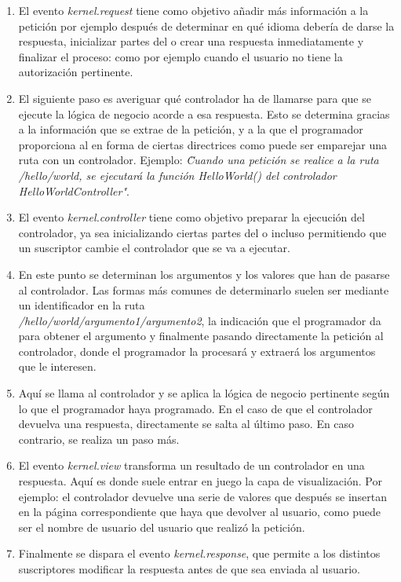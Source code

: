 \begin{enumerate}
    \item El evento \textit{kernel.request} tiene como objetivo añadir más
        información a la petición \textemdash por ejemplo después de determinar
        en qué idioma debería de darse la respuesta\textemdash, inicializar
        partes del  o crear una respuesta
        inmediatamente y finalizar el proceso: como por ejemplo cuando el
        usuario no tiene la autorización pertinente.
    \item El siguiente paso es averiguar qué controlador ha de llamarse para
        que se ejecute la lógica de negocio acorde a esa respuesta. Esto se
        determina gracias a la información que se extrae de la petición, y a la
        que el programador proporciona al  en
        forma de ciertas directrices como puede ser emparejar una ruta con
        un controlador. Ejemplo: \textit{\"Cuando una petición se realice a la
        ruta /hello/world, se ejecutará la función HelloWorld() del controlador
        HelloWorldController"}.
    \item El evento \textit{kernel.controller} tiene como objetivo preparar la
        ejecución del controlador, ya sea inicializando ciertas partes del
         o incluso permitiendo que un
        suscriptor cambie el controlador que se va a ejecutar.
    \item En este punto se determinan los argumentos y los valores que han de
        pasarse al controlador. Las formas más comunes de determinarlo suelen
        ser mediante un identificador en la ruta\\ \textemdash
        \textit{/hello/world/argumento1/argumento2}\textemdash, la indicación
        que el programador da para obtener el argumento y finalmente pasando
        directamente la petición al controlador, donde el programador la
        procesará y extraerá los argumentos que le interesen.
    \item Aquí se llama al controlador y se aplica la lógica de negocio
        pertinente según lo que el programador haya programado. En el caso de
        que el controlador devuelva una respuesta, directamente se salta al
        último paso. En caso contrario, se realiza un paso más.
    \item El evento \textit{kernel.view} transforma un resultado de un
        controlador en una respuesta. Aquí es donde suele entrar en juego la
        capa de visualización. Por ejemplo: el controlador devuelve una serie
        de valores que después se insertan en la página correspondiente que
        haya que devolver al usuario, como puede ser el nombre de usuario del
        usuario que realizó la petición.
    \item Finalmente se dispara el evento \textit{kernel.response}, que permite
        a los distintos suscriptores modificar la respuesta antes de que sea
        enviada al usuario.
\end{enumerate}

